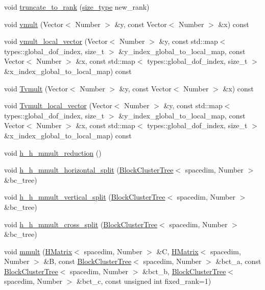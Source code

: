 \begin{DoxyCompactItemize}
\item 
void \hyperlink{classHMatrix_a64be687cacd167efc12b892aa154dcd3}{truncate\+\_\+to\+\_\+rank} (\hyperlink{classHMatrix_a5ca8dc549783d38371a01ecd621ecb34}{size\+\_\+type} new\+\_\+rank)
\item 
void \hyperlink{classHMatrix_aa11b5761aba86606effd14b4bdf31912}{vmult} (Vector$<$ Number $>$ \&y, const Vector$<$ Number $>$ \&x) const
\item 
void \hyperlink{classHMatrix_a2afddab534366617b6be203b3c5238a6}{vmult\+\_\+local\+\_\+vector} (Vector$<$ Number $>$ \&y, const std\+::map$<$ types\+::global\+\_\+dof\+\_\+index, size\+\_\+t $>$ \&y\+\_\+index\+\_\+global\+\_\+to\+\_\+local\+\_\+map, const Vector$<$ Number $>$ \&x, const std\+::map$<$ types\+::global\+\_\+dof\+\_\+index, size\+\_\+t $>$ \&x\+\_\+index\+\_\+global\+\_\+to\+\_\+local\+\_\+map) const
\item 
void \hyperlink{classHMatrix_a72e5255eb5ce46136d0e2b195c82f016}{Tvmult} (Vector$<$ Number $>$ \&y, const Vector$<$ Number $>$ \&x) const
\item 
void \hyperlink{classHMatrix_a166893f3f371d4542cb57aaa33e533d1}{Tvmult\+\_\+local\+\_\+vector} (Vector$<$ Number $>$ \&y, const std\+::map$<$ types\+::global\+\_\+dof\+\_\+index, size\+\_\+t $>$ \&y\+\_\+index\+\_\+global\+\_\+to\+\_\+local\+\_\+map, const Vector$<$ Number $>$ \&x, const std\+::map$<$ types\+::global\+\_\+dof\+\_\+index, size\+\_\+t $>$ \&x\+\_\+index\+\_\+global\+\_\+to\+\_\+local\+\_\+map) const
\item 
void \hyperlink{classHMatrix_a168b6eea2e5b27528497850bf5ee2bbe}{h\+\_\+h\+\_\+mmult\+\_\+reduction} ()
\item 
void \hyperlink{classHMatrix_a38c88893c6ca784d4e56653d8b0e3e67}{h\+\_\+h\+\_\+mmult\+\_\+horizontal\+\_\+split} (\hyperlink{classBlockClusterTree}{Block\+Cluster\+Tree}$<$ spacedim, Number $>$ \&bc\+\_\+tree)
\item 
void \hyperlink{classHMatrix_a253c23d09e89a9a37a7d808374b5ae4e}{h\+\_\+h\+\_\+mmult\+\_\+vertical\+\_\+split} (\hyperlink{classBlockClusterTree}{Block\+Cluster\+Tree}$<$ spacedim, Number $>$ \&bc\+\_\+tree)
\item 
void \hyperlink{classHMatrix_ab315324e3ece178943f406823f792746}{h\+\_\+h\+\_\+mmult\+\_\+cross\+\_\+split} (\hyperlink{classBlockClusterTree}{Block\+Cluster\+Tree}$<$ spacedim, Number $>$ \&bc\+\_\+tree)
\item 
void \hyperlink{classHMatrix_af40d53aabc8bec86fa543638d48ba64e}{mmult} (\hyperlink{classHMatrix}{H\+Matrix}$<$ spacedim, Number $>$ \&C, \hyperlink{classHMatrix}{H\+Matrix}$<$ spacedim, Number $>$ \&B, const \hyperlink{classBlockClusterTree}{Block\+Cluster\+Tree}$<$ spacedim, Number $>$ \&bct\+\_\+a, const \hyperlink{classBlockClusterTree}{Block\+Cluster\+Tree}$<$ spacedim, Number $>$ \&bct\+\_\+b, \hyperlink{classBlockClusterTree}{Block\+Cluster\+Tree}$<$ spacedim, Number $>$ \&bct\+\_\+c, const unsigned int fixed\+\_\+rank=1)

\end{DoxyCompactItemize}
